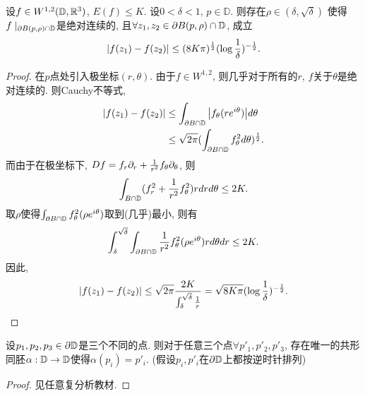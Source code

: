 \begin{lemma} \label{courant_lebesgue}
    设$f \in W^{1,2}(\D,\R^3)$, $E(f) \le K$. 设$0 < \delta < 1$, $p \in \mathbb{D}$. 则存在$\rho \in (\delta, \sqrt{\delta})$ 使得$f\mid_{\P B(p,\rho) \cap \D}$是绝对连续的, 且$\forall z_1,z_2 \in \P B(p,\rho) \cap \D$, 成立 
    \begin{equation}
        \abs{f(z_1)- f(z_2)} \le (8K\pi)^{\frac{1}{2}}(\log \frac{1}{\delta})^{-\frac{1}{2}}.
    \end{equation}
\end{lemma}
\begin{proof}
    在$p$点处引入极坐标$(r,\theta)$. 由于$f \in W^{1,2}$, 则几乎对于所有的$r$, $f$关于$\theta$是绝对连续的.  则Cauchy不等式, 
    \begin{equation}
        \begin{split}
            \abs{f(z_1)-f(z_2)} &\le \int_{\P B \cap \D} \abs{f_\theta(re^{i\theta})}d\theta \\
            & \le \sqrt{2\pi} (\int_{\P B\cap \D} f^2_\theta d\theta)^{\frac{1}{2}}.
        \end{split}
    \end{equation}
    而由于在极坐标下, $Df=f_r \P_r + \frac{1}{r^2}f_\theta \P_\theta$, 则
    \begin{equation}
        \int_{B \cap \D} (f_r^2 + \frac{1}{r^2}f_\theta^2)r drd\theta \le 2K.
    \end{equation}
    取$\rho$使得$\int_{\P B \cap \D} f^2_\theta(\rho e^{i\theta})$取到(几乎)最小, 则有
    \begin{equation}
        \int^{\sqrt{\delta}}_\delta \int_{\P B \cap \D}\frac{1}{r^2}f^2_\theta(\rho e^{i\theta}) rd\theta dr \le 2K.
    \end{equation}
    因此, 
    \begin{equation}
        \abs{f(z_1)-f(z_2)} \le \sqrt{2\pi} \frac{2K}{ \int^{\sqrt{\delta}}_\delta \frac{1}{r}} = \sqrt{8K\pi}(\log \frac{1}{\delta})^{-\frac{1}{2}}.
    \end{equation}
\end{proof}
\begin{lemma}\label{three_point}
    设$p_1,p_2,p_3  \in \partial \D$是三个不同的点. 则对于任意三个点$\forall p'_1, p'_2, p'_3$, 存在唯一的共形同胚$\alpha: \D \to \D$使得$\alpha(p_i)=p'_i$. (假设$p_i, p'_i$在$\P \D$上都按逆时针排列)
\end{lemma}
\begin{proof}
    见任意复分析教材.
\end{proof}
